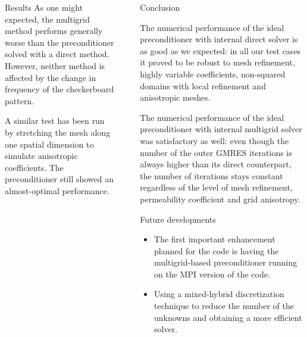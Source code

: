 \documentclass[final]{beamer}
\newlength{\sepwid}
\newlength{\onecolwid}
\begin{document}
\begin{frame}[t]
\begin{columns}[t]
\begin{column}{\onecolwid}
\begin{block}{Results}
As one might expected, the multigrid method performs generally worse than the
preconditioner solved with a direct method. However, neither method is
affected by the change in frequency of the checkerboard pattern.

A similar test has been run by stretching the mesh along one spatial dimension
to simulate anisotropic coefficients. The preconditioner
still showed an almost-optimal performance.
\end{block}

\end{column} %

\begin{column}{\sepwid}\end{column} %

\begin{column}{\onecolwid} %


\begin{block}{Conclusion}

The numerical performance of the ideal preconditioner with internal direct
solver is as good as we expected: in all our test cases it proved to be robust
to mesh refinement, highly variable coefficients, non-squared domains with
local refinement and anisotropic meshes.

The numerical performance of the ideal preconditioner with internal
multigrid solver was satisfactory as well: even though the number of the outer
GMRES iterations is always higher than its direct counterpart, the number of
iterations stays constant regardless of the level of mesh refinement,
permeability coefficient and grid anisotropy.

\end{block}

\begin{block}{Future developments}

\begin{itemize}
    \item The first important enhancement planned for the code is having the
        multigrid-based preconditioner running on the MPI version of the code.
    \item Using a mixed-hybrid discretization technique to reduce the number of
        the unknowns and obtaining a more efficient solver.
\end{itemize}


\end{block}
\end{column}
\end{columns}
\end{frame}
\end{document}
